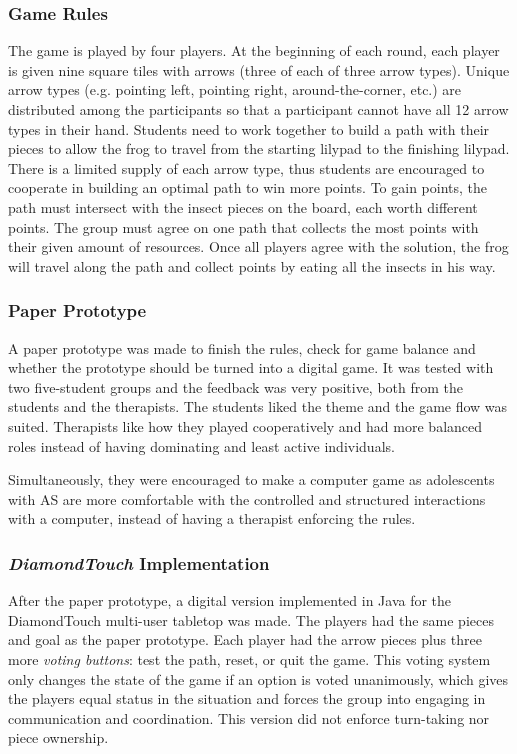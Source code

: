 \documentclass[runningheads]{llncs}
\begin{document}
\subsubsection{Game Rules}
\par The game is played by four players. At the beginning of each round, each player is given nine square tiles with arrows (three of each of three arrow types). Unique arrow types (e.g. pointing left, pointing right, around-the-corner, etc.) are distributed among the participants so that a participant cannot have all 12 arrow types in their hand. Students need to work together to build a path with their pieces to allow the frog to travel from the starting lilypad to the finishing lilypad. There is a limited supply of each arrow type, thus students are encouraged to cooperate in building an optimal path to win more points. To gain points, the path must intersect with the insect pieces on the board, each worth different points. The group must agree on one path that collects the most points with their given amount of resources. Once all players agree with the solution, the frog will travel along the path and collect points by eating all the insects in his way.

\subsubsection{Paper Prototype}
\par A paper prototype was made to finish the rules, check for game balance and whether the prototype should be turned into a digital game. It was tested with two five-student groups and the feedback was very positive, both from the students and the therapists. The students liked the theme and the game flow was suited. Therapists like how they played cooperatively and had more balanced roles instead of having dominating and least active individuals.
\par Simultaneously, they were encouraged to make a computer game as adolescents with AS are more comfortable with the controlled and structured interactions with a computer, instead of having a therapist enforcing the rules.

\subsubsection{\textit{DiamondTouch} Implementation}
\par After the paper prototype, a digital version implemented in Java for the DiamondTouch multi-user tabletop was made. The players had the same pieces and goal as the paper prototype. Each player had the arrow pieces plus three more \textit{voting buttons}: test the path, reset, or quit the game. This voting system only changes the state of the game if an option is voted unanimously, which gives the players equal status in the situation and forces the group into engaging in communication and coordination. This version did not enforce turn-taking nor piece ownership.
\end{document}
